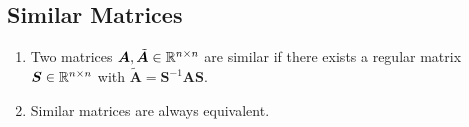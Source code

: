 \subsection{Similar Matrices}

\begin{enumerate}
    \item 
    \begin{definition}
        Two matrices $\bm{A}, \tilde{\bm{A}} \in \mathbb{R}^{n\times n}$ are similar if there exists a regular matrix $\bm{S} \in \mathbb{R}^{n\times n}$ with $\tilde{\bm{A}} = \bm{S} ^{-1}\bm{AS}$.
        \hfill \cite{mfml/book/mml/Deisenroth-Faisal-Ong}
    \end{definition}

    \item Similar matrices are always equivalent.
    \hfill \cite{mfml/book/mml/Deisenroth-Faisal-Ong}
\end{enumerate}








